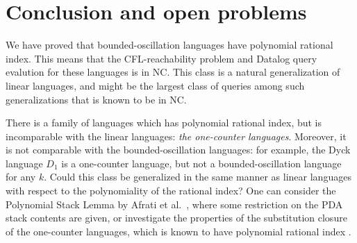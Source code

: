 \documentclass[11pt,a4paper]{article} %
\begin{document}
\section{Conclusion and open problems}
\label{sec:conc}

We have proved that bounded-oscillation languages
have polynomial rational index.
This means that the CFL-reachability problem and Datalog query evalution for these languages is in NC.
This class is a natural generalization of linear languages,
and might be the largest class of queries among such generalizations
that is known to be in NC.


There is a family of languages which has polynomial rational index,
but is incomparable with the linear languages:
\emph{the one-counter languages}.
Moreover, it is not comparable with the bounded-oscillation languages:
for example, the Dyck language $D_1$ is a one-counter language,
but not a bounded-oscillation language for any $k$.
Could this class be generalized in the same manner as linear languages
with respect to the polynomiality of the rational index?
One can consider the Polynomial Stack Lemma by Afrati et al.~\cite{ChainQ},
where some restriction on the PDA stack contents are given,
or investigate the properties of the substitution closure of the one-counter languages,
which is known to have polynomial rational index \cite{RatBasic}. 




\begin{comment}
\section*{Acknowledgments}
This research was supported by the Russian Science Foundation, grant \textnumero 18-11-00100.
\end{comment}




\end{document}
